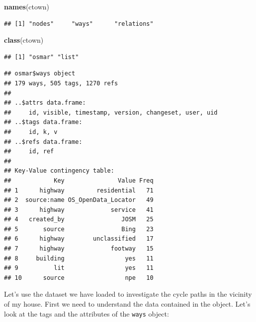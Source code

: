 \documentclass[]{article}
\newenvironment{Shaded}{}{}
\newcommand{\KeywordTok}[1]{\textcolor[rgb]{0.00,0.44,0.13}{\textbf{{#1}}}}
\newcommand{\NormalTok}[1]{{#1}}
\begin{document}
\begin{Shaded}
\begin{Highlighting}[]
\KeywordTok{names}\NormalTok{(ctown)}
\end{Highlighting}
\end{Shaded}
\begin{verbatim}
## [1] "nodes"     "ways"      "relations"
\end{verbatim}
\begin{Shaded}
\begin{Highlighting}[]
\KeywordTok{class}\NormalTok{(ctown)}
\end{Highlighting}
\end{Shaded}
\begin{verbatim}
## [1] "osmar" "list"
\end{verbatim}
\begin{Shaded}
\end{Shaded}
\begin{verbatim}
## osmar$ways object
## 179 ways, 505 tags, 1270 refs 
## 
## ..$attrs data.frame: 
##     id, visible, timestamp, version, changeset, user, uid 
## ..$tags data.frame: 
##     id, k, v 
## ..$refs data.frame: 
##     id, ref 
##  
## Key-Value contingency table:
##            Key               Value Freq
## 1      highway         residential   71
## 2  source:name OS_OpenData_Locator   49
## 3      highway             service   41
## 4   created_by                JOSM   25
## 5       source                Bing   23
## 6      highway        unclassified   17
## 7      highway             footway   15
## 8     building                 yes   11
## 9          lit                 yes   11
## 10      source                 npe   10
\end{verbatim}
Let's use the dataset we have loaded to investigate the cycle paths in
the vicinity of my house. First we need to understand the data contained
in the object. Let's look at the tags and the attributes of the
\texttt{ways} object:
\end{document}
